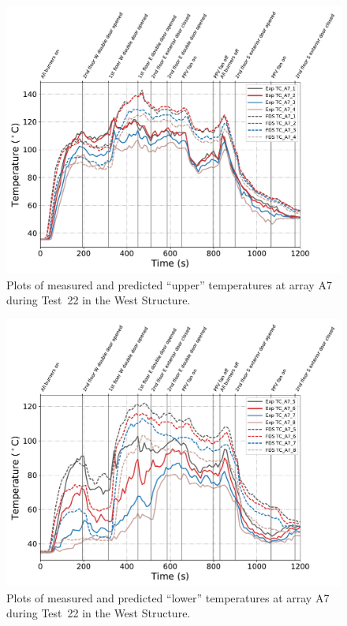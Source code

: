 \begin{figure}[!h]
	\centering
	\includegraphics[width=\columnwidth]{Figures/Plots/Validation/Temperature/Test_22_TC_A7_upper}
	\caption{Plots of measured and predicted ``upper'' temperatures at array A7 during Test~22 in the West Structure.}
	\label{fig:TCA7_upper_data_Test22}
\end{figure}

\begin{figure}[!h]
	\centering
	\includegraphics[width=\columnwidth]{Figures/Plots/Validation/Temperature/Test_22_TC_A7_lower}
	\caption{Plots of measured and predicted ``lower'' temperatures at array A7 during Test~22 in the West Structure.}
	\label{fig:TCA7_lower_data_Test22}
\end{figure}

